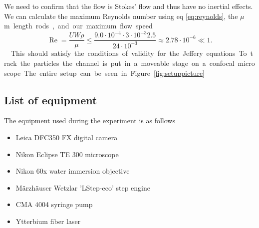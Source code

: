 \noindent We need to confirm that the flow is Stokes' flow and thus have no inertial effects. We can calculate the maximum Reynolds number using eq \ref{eq:reynolds}, the \unit[3]{$\mu$m} length rods, and our maximum flow speed.

\begin{equation}
\operatorname{Re} = \frac{U W \rho}{\mu} 
\leq \frac{9.0\cdot 10^{-4} \cdot 3 \cdot 10^{-3} 2.5 }{24 \cdot 10^{-3}} 
\approx	 2.78  \cdot 10^{-6} \ll 1.
\end{equation}

\noindent This should satisfy the conditions of validity for the Jeffery equations. 

To track the particles the channel is put in a moveable stage on a confocal microscope. The entire setup can be seen in Figure \ref{fig:setuppicture}



\subsection{List of equipment}
 The equipment used during the experiment is as follows
\begin{itemize}
\item Leica DFC350 FX digital camera 
\item Nikon Eclipse TE 300 microscope
\item Nikon 60x water immersion objective
\item Märzhäuser Wetzlar 'LStep-eco' step engine
\item CMA 4004 syringe pump
\item Ytterbium fiber laser  %
\end{itemize}

%
%
	